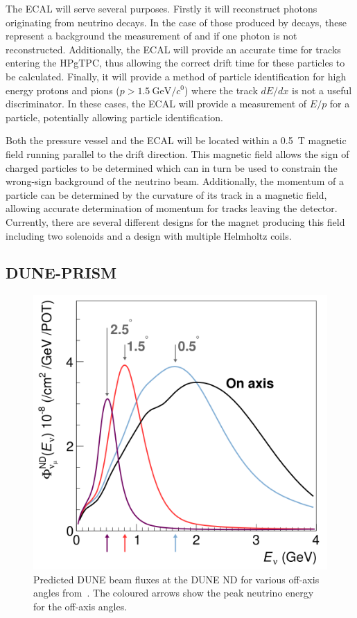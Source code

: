 The ECAL will serve several purposes.
Firstly it will reconstruct photons originating from neutrino decays.
In the case of those produced by \pizero decays, these represent a background the measurement of \nue and \anue if one photon is not reconstructed.
Additionally, the ECAL will provide an accurate time for tracks entering the HPgTPC, thus allowing the correct drift time for these particles to be calculated.
Finally, it will provide a method of particle identification for high energy protons and pions ($p > \SI{1.5}{\giga\electronvolt\per\clight}$) where the track $dE/dx$ is not a useful discriminator.
In these cases, the ECAL will provide a measurement of $E/p$ for a particle, potentially allowing particle identification.

Both the pressure vessel and the ECAL will be located within a \SI{0.5}{\tesla} magnetic field running parallel to the drift direction.
This magnetic field allows the sign of charged particles to be determined which can in turn be used to constrain the wrong-sign background of the neutrino beam.
Additionally, the momentum of a particle can be determined by the curvature of its track in a magnetic field, allowing accurate determination of momentum for tracks leaving the detector.
Currently, there are several different designs for the magnet producing this field including two solenoids and a design with multiple Helmholtz coils. 

\subsection{DUNE-PRISM}
\label{sec:dune:nd:prism}

\begin{figure}[h]
  \centering
  \includegraphics[width=.5\linewidth]{files/figures/dune_detector/offAxisFluxes}
  \caption[Beam \numu fluxes at different off-axis angles at the DUNE ND]{Predicted DUNE beam \numu fluxes at the DUNE ND for various off-axis angles from~\cite{ndCdr}. The coloured arrows show the peak neutrino energy for the off-axis angles.}
  \label{fig:offAxisFluxes}
\end{figure}

